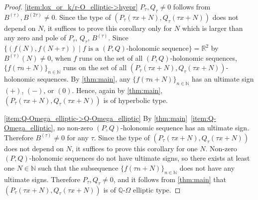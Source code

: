 \documentclass[a4paper,UKenglish,cleveref,autoref,thm-restate]{lipics-v2021}
\newcommand{\R}{\mathbb{R}}
\newcommand{\N}{\mathbb{N}}
\newcommand{\Q}{\mathbb{Q}}
\begin{document}
\begin{proof}
\eqref{item:lox_or_k/r-O_elliptic->hyepr} 
$P_{\tau}, Q_{\tau} \neq 0$ follows from $B^{(\tau)}, B^{(2\tau)} \neq 0$. Since the type of $(P_{\tau}(\tau x + N), Q_{\tau}(\tau x + N))$ does not depend on $N$, it suffices to prove this corollary only for $N$ which is larger than any zero and pole of $P_{\tau}$, $Q_{\tau}$, $B^{(\tau)}$. Since $\{ (f(N), f(N + \tau)) \mid \text{$f$ is a $(P, Q)$-holonomic sequence} \} = \R^2$ by $B^{(\tau)}(N) \neq 0$, when $f$ runs on the set of all $(P, Q)$-holonomic sequences, $\{ f(\tau n + N ) \}_{n \in \N}$ runs on the set of all $(P_{\tau}(\tau x + N), Q_{\tau}(\tau x + N))$-holonomic sequences. By \cref{thm:main}, any $\{ f(\tau n + N ) \}_{n \in \N}$ has an ultimate sign $(+)$, $(-)$, or $(0)$. Hence, again by \cref{thm:main}, $(P_{\tau}(\tau x + N), Q_{\tau}(\tau x + N))$ is of hyperbolic type. 

\eqref{item:Q-Omega_elliptic->Q-Omega_elliptic} 
By \cref{thm:main}~\eqref{item:Q-Omega_elliptic}, 
no non-zero $(P, Q)$-holonomic sequence has an ultimate sign. 
Therefore $B^{(\tau)} \neq 0$ for any $\tau$. 
Since the type of $(P_{\tau}(\tau x + N), Q_{\tau}(\tau x + N))$ does not depend on $N$, it suffices to prove this corollary for one $N$. Non-zero $(P, Q)$-holonomic sequences do not have ultimate signs, so there exists at least one $N \in \N$ such that the subsequence $\{ f( \tau n + N) \}_{n \in \N}$ does not have any ultimate signs. Therefore $P_{\tau}, Q_{\tau} \neq 0$, and it follows from \cref{thm:main} that $(P_{\tau}(\tau x + N), Q_{\tau}(\tau x + N))$ is of $\Q$-$\Omega$ elliptic type. 
\end{proof}
\end{document}
